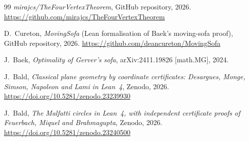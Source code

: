 \documentclass[11pt]{article}
\theoremstyle{definition}
\theoremstyle{remark}
\begin{document}
\begin{thebibliography}{99}
\emph{mirajcs/TheFourVertexTheorem},
GitHub repository, 2026. \url{https://github.com/mirajcs/TheFourVertexTheorem}

D.~Cureton,
\emph{MovingSofa} (Lean formalisation of Baek's moving-sofa proof),
GitHub repository, 2026. \url{https://github.com/deancureton/MovingSofa}

J.~Baek,
\emph{Optimality of Gerver's sofa}, arXiv:2411.19826 [math.MG], 2024.

J.~Bald,
\emph{Classical plane geometry by coordinate certificates: Desargues, Monge, Simson, Napoleon and Lami in Lean~4},
Zenodo, 2026. \url{https://doi.org/10.5281/zenodo.23239930}

J.~Bald,
\emph{The Malfatti circles in Lean~4, with independent certificate proofs of Feuerbach, Miquel and Brahmagupta},
Zenodo, 2026. \url{https://doi.org/10.5281/zenodo.23240500}

\end{thebibliography}
\end{document}

